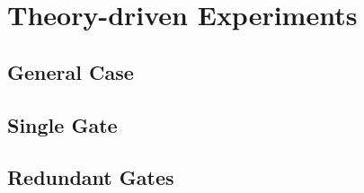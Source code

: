 \documentclass{article}
\begin{document}
\section{Theory-driven Experiments}

\subsection{General Case}

\subsection{Single Gate}

\subsection{Redundant Gates}
\end{document}
